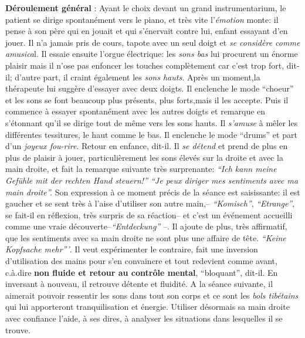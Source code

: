  	 \textbf{Déroulement général} :
Ayant le choix devant un grand instrumentarium,
        le patient se dirige spontanément vers le piano, et très vite
        l'\textit{émotion} monte: il pense à son père qui en jouait et qui
        s'énervait contre lui, enfant essayant d'en
        jouer. Il n'a jamais pris de cours, tapote avec un seul doigt et \textit{se considère comme
        amusica}l. Il essaie ensuite l'orgue électrique: les \textit{sons bas}
        lui procurent un énorme plaisir mais il n'ose pas enfoncer les touches
        complètement car c'est trop fort, dit-il; d'autre part, il
        craint également les
        \textit{sons hauts.}
        Après un moment,la thérapeute lui suggère d'essayer avec deux doigts.
        Il enclenche le mode ``choeur'' et les sons se font beaucoup
        plus présents, plus forts,mais il les accepte. Puis il commence à essayer spontanément
        avec les autres doigts et remarque en s'étonnant qu'il se
        dirige tout de même vers les sons
        hauts. Il \textit{s'amuse} à mêler les différentes tessitures,
        le haut comme le bas.
        Il enclenche le mode ``drums'' et part d'un\textit{ joyeux
        fou-rire}. Retour en enfance, dit-il.
        Il \textit{se détend} et prend de plus en plus de plaisir à jouer, particulièrement  les sons élevés
        sur la droite et avec la main droite, et fait
        la remarque suivante très surprenante:
        \textit{``Ich kann meine Gefühle mit der rechten Hand steuern!''
        ``Je peux diriger mes sentiments avec ma main droite''.}
 Son expression à ce moment précis de la séance est saisissante: il
        est gaucher et se sent très à l'aise d'utiliser son autre
        main,-- \textit{``Komisch''},  \textit{``Etrange''}, se fait-il
        en réflexion, très surpris de sa réaction-- et c'est un événement
        accueilli comme une vraie
        découverte--\textit{``Entdeckung''} --.
        Il ajoute de plus, très affirmatif, que les sentiments avec sa main
        droite ne sont plus une affaire de tête. \textit{``Keine
        Kopfsache mehr'''}. Il veut expérimenter le contraire, fait
      une inversion d'utilisation des mains pour s'en convaincre et tout redevient comme
        avant, c.à.dire \textbf{non fluide et retour au contrôle
          mental},
        ``bloquant'', dit-il. En inversant à nouveau, il retrouve
        détente et fluidité.
        A la séance suivante, il aimerait pouvoir ressentir
        les sons dans tout son corps et ce sont les\textit{ bols
          tibétains } qui lui
        apporteront tranquilisation et
        énergie. Utiliser désormais sa main
        droite avec confiance l'aide, à ses dires, à analyser les
        situations dans lesquelles il se trouve.

